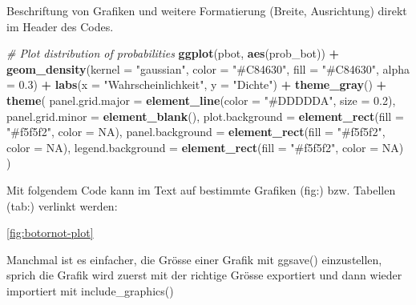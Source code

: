 \documentclass[
  11pt,
]{article}
\newenvironment{Shaded}{\begin{snugshade}}{\end{snugshade}}
\newcommand{\CommentTok}[1]{\textcolor[rgb]{0.56,0.35,0.01}{\textit{#1}}}
\newcommand{\DataTypeTok}[1]{\textcolor[rgb]{0.13,0.29,0.53}{#1}}
\newcommand{\FloatTok}[1]{\textcolor[rgb]{0.00,0.00,0.81}{#1}}
\newcommand{\KeywordTok}[1]{\textcolor[rgb]{0.13,0.29,0.53}{\textbf{#1}}}
\newcommand{\NormalTok}[1]{#1}
\newcommand{\OperatorTok}[1]{\textcolor[rgb]{0.81,0.36,0.00}{\textbf{#1}}}
\newcommand{\OtherTok}[1]{\textcolor[rgb]{0.56,0.35,0.01}{#1}}
\newcommand{\StringTok}[1]{\textcolor[rgb]{0.31,0.60,0.02}{#1}}
\begin{document}
Beschriftung von Grafiken und weitere Formatierung (Breite, Ausrichtung) direkt im Header des Codes.

\small

\linespread{1}

\begin{Shaded}
\begin{Highlighting}[]
\CommentTok{\# Plot distribution of probabilities}
\KeywordTok{ggplot}\NormalTok{(pbot, }\KeywordTok{aes}\NormalTok{(prob\_bot)) }\OperatorTok{+}\StringTok{ }
\StringTok{  }\KeywordTok{geom\_density}\NormalTok{(}\DataTypeTok{kernel =} \StringTok{"gaussian"}\NormalTok{, }\DataTypeTok{color =} \StringTok{"\#C84630"}\NormalTok{, }\DataTypeTok{fill =} \StringTok{"\#C84630"}\NormalTok{, }\DataTypeTok{alpha =} \FloatTok{0.3}\NormalTok{) }\OperatorTok{+}
\StringTok{  }\KeywordTok{labs}\NormalTok{(}\DataTypeTok{x =} \StringTok{"Wahrscheinlichkeit"}\NormalTok{, }\DataTypeTok{y =} \StringTok{"Dichte"}\NormalTok{)  }\OperatorTok{+}\StringTok{ }
\StringTok{  }\KeywordTok{theme\_gray}\NormalTok{() }\OperatorTok{+}
\StringTok{  }\KeywordTok{theme}\NormalTok{(}
    \DataTypeTok{panel.grid.major =} \KeywordTok{element\_line}\NormalTok{(}\DataTypeTok{color =} \StringTok{"\#DDDDDA"}\NormalTok{, }\DataTypeTok{size =} \FloatTok{0.2}\NormalTok{),}
      \DataTypeTok{panel.grid.minor =} \KeywordTok{element\_blank}\NormalTok{(),}
      \DataTypeTok{plot.background =} \KeywordTok{element\_rect}\NormalTok{(}\DataTypeTok{fill =} \StringTok{"\#f5f5f2"}\NormalTok{, }\DataTypeTok{color =} \OtherTok{NA}\NormalTok{), }
      \DataTypeTok{panel.background =} \KeywordTok{element\_rect}\NormalTok{(}\DataTypeTok{fill =} \StringTok{"\#f5f5f2"}\NormalTok{, }\DataTypeTok{color =} \OtherTok{NA}\NormalTok{), }
      \DataTypeTok{legend.background =} \KeywordTok{element\_rect}\NormalTok{(}\DataTypeTok{fill =} \StringTok{"\#f5f5f2"}\NormalTok{, }\DataTypeTok{color =} \OtherTok{NA}\NormalTok{)}
\NormalTok{  )}
\end{Highlighting}
\end{Shaded}

\linespread{1.5}

\normalsize

Mit folgendem Code kann im Text auf bestimmte Grafiken (fig:) bzw. Tabellen (tab:) verlinkt werden:

\ref{fig:botornot-plot}

Manchmal ist es einfacher, die Grösse einer Grafik mit ggsave() einzustellen, sprich die Grafik wird zuerst mit der richtige Grösse exportiert und dann wieder importiert mit include\_graphics()
\end{document}
